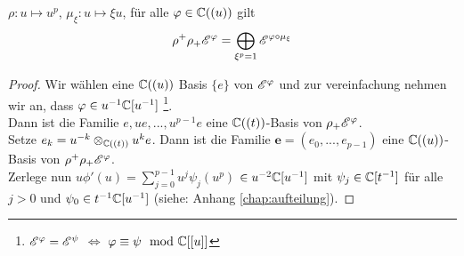 
\begin{comment}
  sabbah\_Fourier-local.pdf lemma 2.4
  \cite{sabbah_Fourier-local}
\end{comment}

\begin{lem}
  $\rho:u\mapsto u^p$,
  $\mu_\xi:u\mapsto\xi u$,
  für alle $\varphi \in \mathbb{C}((u))$ gilt
  \[ \rho^+\rho_+\mathscr{E}^\varphi=\bigoplus_{\xi^p=1}\mathscr{E}^{\varphi\circ\mu_\xi} \]
\end{lem}

\begin{proof}

Wir wählen eine $\mathbb{C}((u))$ Basis $\{e\}$ von $\mathscr{E}^\varphi$ und zur
vereinfachung nehmen wir an, dass $\varphi\in u^{-1}\mathbb{C}[u^{-1}]$
\footnote{$\mathscr{E}^\varphi=\mathscr{E}^\psi$ $\Leftrightarrow$ $\varphi\equiv\psi\mod{\mathbb{C}}[[u]]$}.\\
Dann ist die Familie $e,ue,...,u^{p-1}e$ eine $\mathbb{C}((t))$-Basis von
$\rho_+\mathscr{E}^\varphi$.\\
Setze $e_k=u^{-k}\otimes_{\mathbb{C}((t))}u^ke$.
Dann ist die Familie $\mathbf{e}=(e_0,...,e_{p-1})$ eine $\mathbb{C}((u))$-Basis von
$\rho^+\rho_+\mathscr{E}^\varphi$.\\
Zerlege nun $u\phi'(u)=\sum_{j=0}^{p-1}u^j\psi_j(u^p)$ $\in u^{-2}\mathbb{C}[u^{-1}]$
mit $\psi_j\in\mathbb{C}[t^{-1}]$ für alle $j>0$ und $\psi_0\in t^{-1}\mathbb{C}[u^{-1}]$
(siehe: Anhang \ref{chap:aufteilung}).


\end{proof}
